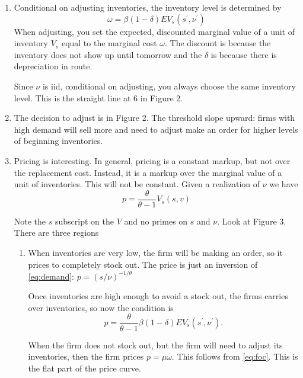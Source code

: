 \documentclass[11pt, pdftex]{article}
\begin{document}
\begin{enumerate}
  \item Conditional on adjusting inventories, the inventory level is determined by
  \begin{equation}\label{eq:foc}
    \omega = \beta (1-\delta) E V_s(s^\prime, \nu^\prime)
  \end{equation}
  When adjusting, you set the expected, discounted marginal value of a unit of inventory $V_s$ equal to the marginal cost $\omega$. The discount is because the inventory does not show up until tomorrow and the $\delta$ is because there is depreciation in route.

  Since $\nu$ is iid, conditional on adjusting, you always choose the same inventory level. This is the straight line at 6 in Figure 2.

  \item The decision to adjust is in Figure 2. The threshold slope upward: firms with high demand will sell more and need to adjust make an order for higher levels of beginning inventories.

    \item Pricing is interesting. In general, pricing is a constant markup, but not over the replacement cost. Instead, it is a markup over the marginal value of a unit of inventories. This will not be constant. Given a realization of $\nu$ we have
        \begin{equation}\label{}
          p=\frac{\theta}{\theta-1}V_s(s,v)
        \end{equation}

        Note the $s$ subscript on the $V$ and no primes on $s$ and $\nu$. Look at Figure 3. There are three regions
        \begin{enumerate}
          \item When inventories are very low, the firm will be making an order, so it prices to completely stock out. The price is just an inversion of \eqref{eq:demand}: $p=(s/\nu)^{-1/\theta}$

              Once inventories are high enough to avoid a stock out, the firms carries over inventories, so now the condition is
            \begin{equation}\label{}
          p=\frac{\theta}{\theta-1}\beta(1-\delta)EV_s(s^\prime,\nu^\prime).
        \end{equation}


          When the firm does not stock out, but the firm will need to adjust its inventories, then the firm prices $p=\mu \omega$. This follows from \eqref{eq:foc}. This is the flat part of the price curve.


\end{enumerate}
\end{enumerate}
\end{document}
